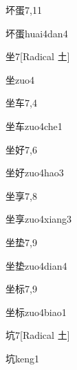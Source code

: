 \begin{entry}{坏蛋}{7,11}
  \begin{phonetics}{坏蛋}{huai4dan4}
  \end{phonetics}
\end{entry}

\begin{entry}{坐}{7}[Radical 土]
  \begin{phonetics}{坐}{zuo4}
  \end{phonetics}
\end{entry}

\begin{entry}{坐车}{7,4}
  \begin{phonetics}{坐车}{zuo4che1}
  \end{phonetics}
\end{entry}

\begin{entry}{坐好}{7,6}
  \begin{phonetics}{坐好}{zuo4hao3}
  \end{phonetics}
\end{entry}

\begin{entry}{坐享}{7,8}
  \begin{phonetics}{坐享}{zuo4xiang3}
  \end{phonetics}
\end{entry}

\begin{entry}{坐垫}{7,9}
  \begin{phonetics}{坐垫}{zuo4dian4}
  \end{phonetics}
\end{entry}

\begin{entry}{坐标}{7,9}
  \begin{phonetics}{坐标}{zuo4biao1}
  \end{phonetics}
\end{entry}

\begin{entry}{坑}{7}[Radical 土]
  \begin{phonetics}{坑}{keng1}
  \end{phonetics}
\end{entry}

